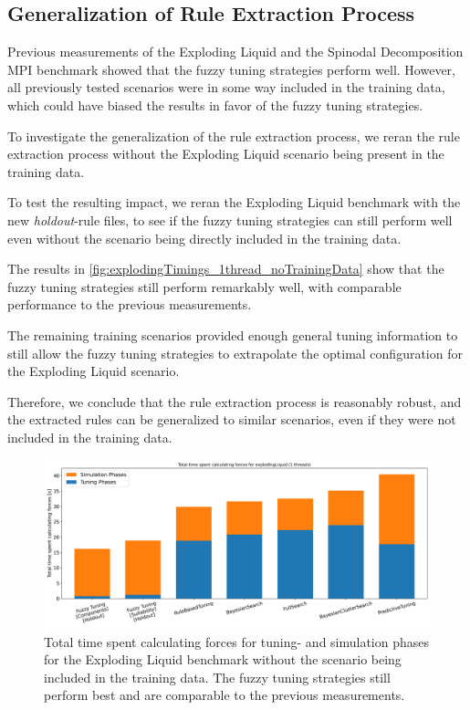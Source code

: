 \newpage

\subsection{Generalization of Rule Extraction Process}

Previous measurements of the Exploding Liquid and the Spinodal Decomposition MPI benchmark showed that the fuzzy tuning strategies perform well. However, all previously tested scenarios were in some way included in the training data, which could have biased the results in favor of the fuzzy tuning strategies.

To investigate the generalization of the rule extraction process, we reran the rule extraction process without the Exploding Liquid scenario being present in the training data.

To test the resulting impact, we reran the Exploding Liquid benchmark with the new \emph{holdout}-rule files, to see if the fuzzy tuning strategies can still perform well even without the scenario being directly included in the training data.

The results in \autoref{fig:explodingTimings_1thread_noTrainingData} show that the fuzzy tuning strategies still perform remarkably well, with comparable performance to the previous measurements.

The remaining training scenarios provided enough general tuning information to still allow the fuzzy tuning strategies to extrapolate the optimal configuration for the Exploding Liquid scenario.

Therefore, we conclude that the rule extraction process is reasonably robust, and the extracted rules can be generalized to similar scenarios, even if they were not included in the training data.

\begin{figure}[H]
    \centering
    \includegraphics[width=\columnwidth,trim={0cm 0 0cm 0.9cm},clip]{figures/Benchmark/ExplodingLiquidHoldout/total_time_explodingLiquid_1.png}
    \caption[
        Benchmark Results for the Exploding Liquid Scenario (Holdout)
    ]{
        Total time spent calculating forces for tuning- and simulation phases for the Exploding Liquid benchmark without the scenario being included in the training data. The fuzzy tuning strategies still perform best and are comparable to the previous measurements.
    }
    \label{fig:explodingTimings_1thread_noTrainingData}
\end{figure}
